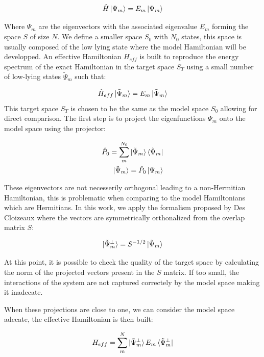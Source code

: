 \documentclass[10pt]{report}
\numberwithin{equation}{section}
\begin{document}
\begin{equation}
    \hat{H}\ket{\Psi_m}=E_m\ket{\Psi_m}
\end{equation}

Where $\Psi_m$ are the eigenvectors with the associated eigenvalue $E_m$ forming the space $S$ of size $N$. 
We define a smaller space $S_0$ with $N_0$ states, this space is usually composed of the low lying state where the model Hamiltonian will be developped.
An effective Hamiltonian $H_{eff}$  is built to reproduce the energy spectrum of the exact Hamiltonian in the target space $S_T$ using a small number of low-lying states $\tilde{\Psi}_m$ such that:

\begin{equation}
    \hat{H}_{eff}\ket{\tilde{\Psi}_m}=E_m \ket{\tilde{\Psi}_m}
\end{equation}
This target space $S_T$ is chosen to be the same as the model space $S_0$ allowing for direct comparison.
The first step is to project the eigenfunctions $\Psi_m$ onto the model space using the projector:

\begin{align}
    \hat{P}_0=\sum_{m}^{N_0} \ket{\tilde{\Psi}_m} \bra{\tilde{\Psi}_m}\\
    \ket{\tilde{\Psi}_m}=\hat{P}_0 \ket{\Psi_m}
\end{align}

These eigenvectors are not necesserily orthogonal leading to a non-Hermitian Hamiltonian, this is problematic when comparing to the model Hamiltonians which are Hermitians.
In this work, we apply the formalism proposed by Des Cloizeaux where the vectors are symmetrically orthonalized from the overlap matrix $S$:

\begin{equation}
    \ket{\tilde{\Psi}_m^\bot}=S^{-1/2} \ket{\tilde{\Psi}_m}
\end{equation}

At this point, it is possible to check the quality of the target space by calculating the norm of the projected vectors present in the $S$ matrix.
If too small, the interactions of the system are not captured correctely by the model space making it inadecate. 
\par When these projections are close to one, we can consider the model space adecate, the effective Hamiltonian is then built:

\begin{equation}
    H_{eff}=\sum_{m}^{N}\ket{\tilde{\Psi}_m^{\bot}}E_m \bra{\tilde{\Psi}_m^{\bot}}
\end{equation}
\end{document}
